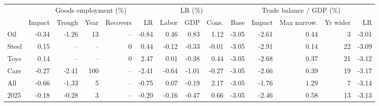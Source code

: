 \begin{tabular}{lrrrrrrrrrrrrr}
\toprule
 & \multicolumn{5}{c}{Goods employment (\%)} & \multicolumn{3}{c}{LR (\%)} & \multicolumn{5}{c}{Trade balance / GDP (\%)} \\
\cmidrule(lr){2-6}\cmidrule(lr){7-9}\cmidrule(lr){10-14}
 & Impact & Trough & Year & Recovers & LR & Labor & GDP & Cons. & Base & Impact & Max narrow. & Yr wider & LR \\
\midrule
Oil & -0.34 & -1.26 & 13 & -- & -0.84 & 0.46 & 0.83 & 1.12 & -3.05 & -2.61 & 0.44 & 3 & -3.01 \\
Steel & 0.15 & -- & -- & 0 & 0.44 & -0.12 & -0.33 & -0.01 & -3.05 & -2.91 & 0.14 & 22 & -3.09 \\
Toys & 0.14 & -- & -- & 0 & 2.47 & 0.01 & -0.38 & 0.44 & -3.05 & -2.68 & 0.37 & 21 & -3.12 \\
Cars & -0.27 & -2.41 & 100 & -- & -2.41 & -0.64 & -1.01 & -0.27 & -3.05 & -2.66 & 0.39 & 19 & -3.17 \\
All & -0.66 & -1.33 & 5 & -- & -0.75 & 0.07 & -0.19 & 2.17 & -3.05 & -1.76 & 1.29 & 7 & -3.14 \\
2025 & -0.18 & -0.28 & 3 & -- & -0.20 & -0.16 & -0.47 & 0.66 & -3.05 & -2.46 & 0.58 & 13 & -3.13 \\
\bottomrule
\end{tabular}
